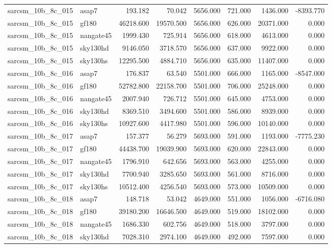 \begin{tabular}{llrrrrrr}
sarcsm\_10b\_8c\_015 & asap7 & 193.182 & 70.042 & 5656.000 & 721.000 & 1436.000 & -8393.770 \\
sarcsm\_10b\_8c\_015 & gf180 & 46218.600 & 19570.500 & 5656.000 & 626.000 & 20371.000 & 0.000 \\
sarcsm\_10b\_8c\_015 & nangate45 & 1999.430 & 725.914 & 5656.000 & 618.000 & 4613.000 & 0.000 \\
sarcsm\_10b\_8c\_015 & sky130hd & 9146.050 & 3718.570 & 5656.000 & 637.000 & 9922.000 & 0.000 \\
sarcsm\_10b\_8c\_015 & sky130hs & 12295.500 & 4884.710 & 5656.000 & 635.000 & 11407.000 & 0.000 \\
sarcsm\_10b\_8c\_016 & asap7 & 176.837 & 63.540 & 5501.000 & 666.000 & 1165.000 & -8547.000 \\
sarcsm\_10b\_8c\_016 & gf180 & 52782.800 & 22158.700 & 5501.000 & 706.000 & 25248.000 & 0.000 \\
sarcsm\_10b\_8c\_016 & nangate45 & 2007.940 & 726.712 & 5501.000 & 645.000 & 4753.000 & 0.000 \\
sarcsm\_10b\_8c\_016 & sky130hd & 8369.510 & 3494.600 & 5501.000 & 586.000 & 8939.000 & 0.000 \\
sarcsm\_10b\_8c\_016 & sky130hs & 10927.600 & 4417.980 & 5501.000 & 596.000 & 10140.000 & 0.000 \\
sarcsm\_10b\_8c\_017 & asap7 & 157.377 & 56.279 & 5693.000 & 591.000 & 1193.000 & -7775.230 \\
sarcsm\_10b\_8c\_017 & gf180 & 44438.700 & 19039.900 & 5693.000 & 620.000 & 22843.000 & 0.000 \\
sarcsm\_10b\_8c\_017 & nangate45 & 1796.910 & 642.656 & 5693.000 & 563.000 & 4255.000 & 0.000 \\
sarcsm\_10b\_8c\_017 & sky130hd & 7700.940 & 3285.650 & 5693.000 & 561.000 & 8716.000 & 0.000 \\
sarcsm\_10b\_8c\_017 & sky130hs & 10512.400 & 4256.540 & 5693.000 & 573.000 & 10509.000 & 0.000 \\
sarcsm\_10b\_8c\_018 & asap7 & 148.718 & 53.042 & 4649.000 & 551.000 & 1056.000 & -6716.080 \\
sarcsm\_10b\_8c\_018 & gf180 & 39180.200 & 16646.500 & 4649.000 & 519.000 & 18102.000 & 0.000 \\
sarcsm\_10b\_8c\_018 & nangate45 & 1686.330 & 602.756 & 4649.000 & 518.000 & 3797.000 & 0.000 \\
sarcsm\_10b\_8c\_018 & sky130hd & 7028.310 & 2974.100 & 4649.000 & 492.000 & 7597.000 & 0.000 \\

\end{tabular}
